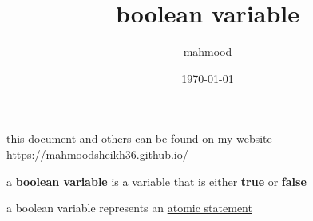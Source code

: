 \documentclass[a4paper,12pt]{article}
\author{mahmood}
\date{\today}
\title{boolean variable}
\begin{document}
\maketitle
\begin{note}
this document and others can be found on my website\\
\url{https://mahmoodsheikh36.github.io/}
\end{note}
\begin{definition}
a \textbf{boolean variable} is a variable that is either \textbf{true} or \textbf{false}\\
\end{definition}
\begin{characteristic}
a boolean variable represents an \href{20230401175521-atomic_statement.org}{atomic statement}\\
\end{characteristic}
\end{document}
